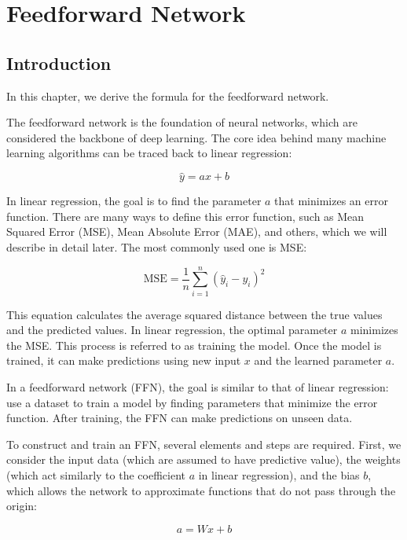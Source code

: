 \chapter{Feedforward Network}

\section{Introduction}

In this chapter, we derive the formula for the feedforward network.

The feedforward network is the foundation of neural networks, which are considered the backbone of deep learning. The core idea behind many machine learning algorithms can be traced back to linear regression:

\[
\hat{y} = ax + b
\]

In linear regression, the goal is to find the parameter \( a \) that minimizes an error function. There are many ways to define this error function, such as Mean Squared Error (MSE), Mean Absolute Error (MAE), and others, which we will describe in detail later. The most commonly used one is MSE:

\begin{equation}
    \text{MSE} = \frac{1}{n} \sum_{i=1}^{n} (\hat{y}_i - y_i)^2
\end{equation}

This equation calculates the average squared distance between the true values and the predicted values. In linear regression, the optimal parameter \( a \) minimizes the MSE. This process is referred to as training the model. Once the model is trained, it can make predictions using new input \( x \) and the learned parameter \( a \).

In a feedforward network (FFN), the goal is similar to that of linear regression: use a dataset to train a model by finding parameters that minimize the error function. After training, the FFN can make predictions on unseen data.

To construct and train an FFN, several elements and steps are required. First, we consider the input data (which are assumed to have predictive value), the weights (which act similarly to the coefficient \( a \) in linear regression), and the bias \( b \), which allows the network to approximate functions that do not pass through the origin:

\begin{equation}
    a = Wx + b
\end{equation}

